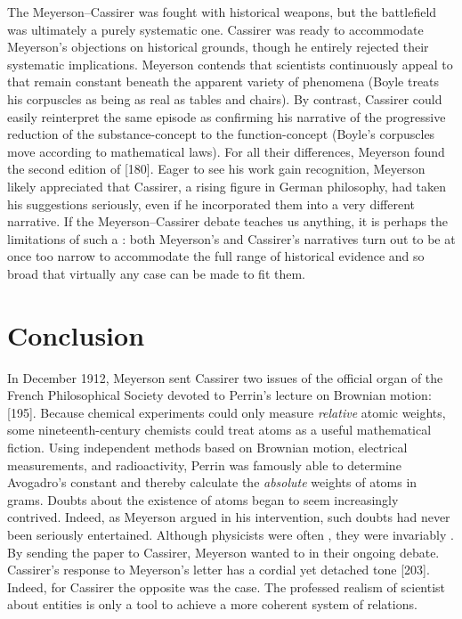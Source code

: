 \documentclass[submitted,12pt]{article}
\begin{document}
The Meyerson--Cassirer  was fought with historical weapons, but the battlefield was ultimately a purely systematic one. Cassirer was ready to accommodate Meyerson’s objections on historical grounds, though he entirely rejected their systematic implications. Meyerson contends that scientists continuously appeal to  that remain constant beneath the apparent variety of phenomena (Boyle treats his corpuscles as being as real as tables and chairs). By contrast, Cassirer could easily reinterpret the same episode as confirming his narrative of the progressive reduction of the substance-concept to the function-concept (Boyle's corpuscles move according to mathematical laws). For all their differences, Meyerson found the second edition of \EPt {} [180]. Eager to see his work gain recognition, Meyerson likely appreciated that Cassirer, a rising figure in German philosophy, had taken his suggestions seriously, even if he incorporated them into a very different narrative. If the Meyerson--Cassirer debate teaches us anything, it is perhaps the limitations of such a : both Meyerson's and Cassirer's narratives turn out to be at once too narrow to accommodate the full range of historical evidence and so broad that virtually any case can be made to fit them.

\section*{Conclusion}
%
In December 1912, Meyerson sent Cassirer two issues of the official organ of the French Philosophical Society devoted to Perrin’s lecture on Brownian motion:  [195]. Because chemical experiments could only measure \emph{relative} atomic weights, some nineteenth-century chemists could treat atoms as a useful mathematical fiction. Using independent methods based on Brownian motion, electrical measurements, and radioactivity, Perrin was famously able to determine Avogadro's constant \citep[281]{Perrin1910} and thereby calculate the \emph{absolute} weights of atoms in grams. Doubts about the existence of atoms began to seem increasingly contrived. Indeed, as Meyerson argued in his intervention, such doubts had never been seriously entertained. Although physicists were often , they were invariably .  By sending the paper to Cassirer, Meyerson wanted to  in their ongoing debate. Cassirer’s response to Meyerson’s letter has a cordial yet detached tone [203]. Indeed, for Cassirer the opposite was the case. The professed realism of scientist about  entities is only a tool to achieve a more coherent system of  relations.
\end{document}
